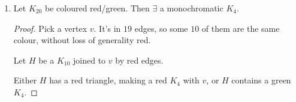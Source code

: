 \documentclass{article}
\newcommand{\red}[1]{\textcolor{bred}{#1}}
\newcommand{\green}[1]{\textcolor{bgreen}{#1}}
\begin{document}
\begin{eg}
\begin{enumerate}
\begin{proof}
\begin{itemize}
                        If any edge between $w, x, y, z$ is \red{red}, we have a \red{red triangle}.

                        If not, they are all \green{green} and we have a \green{green $K_4$}.

                    \item $v$ is in \green{$6$ green} edges
                        \begin{center}
                        \end{center}

                        We know $H$ contains a monochromatic triangle. If it is \red{red}, we are done.  If it is \green{green}, then it makes a \green{green $K_4$} with $v$ as required. \qedhere
                \end{itemize}
            \end{proof}
        \item Let $K_{20}$ be coloured \red{red}/\green{green}. Then $\exists$ a monochromatic $K_4$.
            \begin{proof}
                Pick a vertex $v$. It's in $19$ edges, so some $10$ of them are the same colour, without loss of generality \red{red}.

                Let $H$ be a $K_{10}$ joined to $v$ by \red{red} edges.

                Either $H$ has a \red{red triangle}, making a \red{red $K_4$} with $v$, or $H$ contains a \green{green $K_4$}.
            \end{proof}
    \end{enumerate}
\end{eg}
\end{document}

